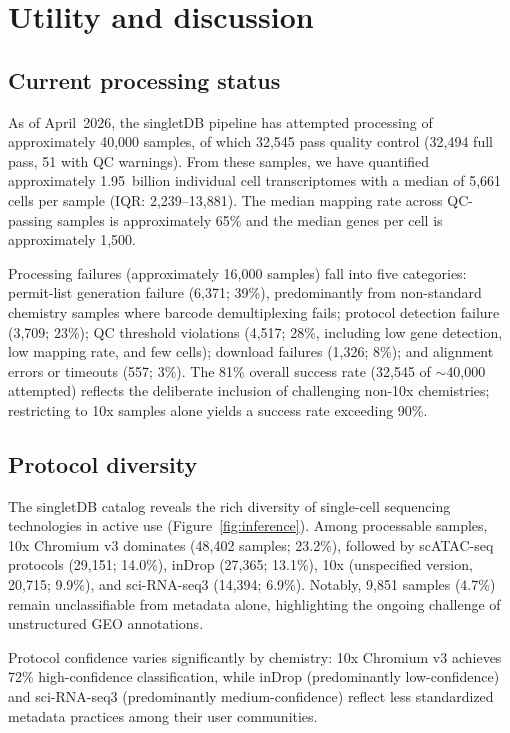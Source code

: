 \documentclass[10pt,twocolumn,letterpaper]{article}
\begin{document}
\section{Utility and discussion}

\subsection{Current processing status}

As of April~2026, the singletDB pipeline has attempted processing of
approximately 40,000 samples, of which 32,545 pass quality control
(32,494 full pass, 51 with QC warnings). From these samples, we have
quantified approximately 1.95~billion individual cell transcriptomes
with a median of 5,661 cells per sample (IQR: 2,239--13,881). The median
mapping rate across QC-passing samples is approximately 65\% and the
median genes per cell is approximately 1,500.

Processing failures (approximately 16,000 samples) fall into five categories:
permit-list generation failure (6,371; 39\%), predominantly from non-standard
chemistry samples where barcode demultiplexing fails; protocol detection
failure (3,709; 23\%); QC threshold violations (4,517; 28\%, including low
gene detection, low mapping rate, and few cells); download failures
(1,326; 8\%); and alignment errors or timeouts (557; 3\%).
The 81\% overall success rate (32,545 of $\sim$40,000 attempted) reflects
the deliberate inclusion of challenging non-10x chemistries; restricting to
10x samples alone yields a success rate exceeding 90\%.

\subsection{Protocol diversity}

The singletDB catalog reveals the rich diversity of single-cell sequencing
technologies in active use (Figure~\ref{fig:inference}). Among processable
samples, 10x Chromium v3 dominates (48,402 samples; 23.2\%), followed by
scATAC-seq protocols (29,151; 14.0\%), inDrop (27,365; 13.1\%), 10x
(unspecified version, 20,715; 9.9\%), and sci-RNA-seq3 (14,394; 6.9\%).
Notably, 9,851 samples (4.7\%) remain unclassifiable from metadata alone,
highlighting the ongoing challenge of unstructured GEO annotations.

Protocol confidence varies significantly by chemistry: 10x Chromium v3
achieves 72\% high-confidence classification, while inDrop (predominantly
low-confidence) and sci-RNA-seq3 (predominantly medium-confidence) reflect
less standardized metadata practices among their user communities.
\end{document}
